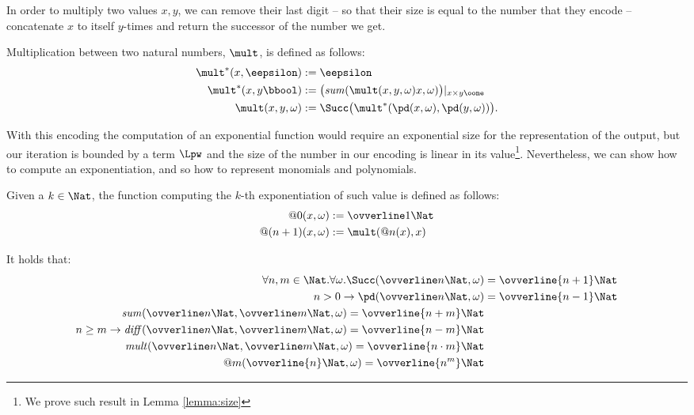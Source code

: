 \begin{conditional}{\notappendix}
  \noindent
  In order to multiply two values $x,y$,
  we can remove their last digit -- so that their size
  is equal to the number that they encode --
  concatenate $x$ to itself $y$-times and
  return the successor of the number we get.

  \begin{defn}[Multiplication]
  Multiplication between two natural numbers,
  $\mult$, is defined
  as follows:
  \begin{align*}
  {\mult^*}(x,  \eepsilon) &:= \eepsilon \\
  {\mult^*}(x, y\bbool) &:= \big(\mathit{sum}(\mult(x, y, \omega)
  x, \omega)\big)|_{x\times y\oone} \\
  \mult(x, y, \omega) &:= \Succ\big( \mult^*(\pd(x,\omega),
  \pd(y,\omega))\big).
  \end{align*}
  \end{defn}
  \noindent
  With this encoding the computation of an exponential function
  would require an exponential size for the representation
  of the output, but our iteration is bounded by a term $\Lpw$
  and the size of the number in our encoding is
  linear in its value\footnote{We prove such result in Lemma \ref{lemma:size}}.
  Nevertheless, we can show how to compute an exponentiation, and so
  how to represent monomials and polynomials.

  \begin{defn}[Exponentiation]
  Given a $k\in \Nat$, the function computing
  the $k$-th exponentiation of such value
  is defined as follows:
  \begin{align*}
    @0(x, \omega)&:= \ovverline 1 \Nat\\
    @(n+1)(x, \omega)&:= \mult(@n(x), x)\\
  \end{align*}
  \end{defn}

  \begin{remark}
    It holds that:
    \begin{align*}
      \forall n, m \in \Nat.\forall \omega. \Succ (\ovverline n \Nat, \omega) &=\ovverline {n+1} \Nat \\
      n>0\to  \pd (\ovverline n \Nat, \omega) &=\ovverline {n-1} \Nat \\
      \mathit{sum}(\ovverline n \Nat, \ovverline m \Nat, \omega)= \ovverline {n+m}\Nat\\
      n\ge m \to \mathit{diff}(\ovverline n \Nat, \ovverline m \Nat, \omega)= \ovverline {n-m}\Nat\\
      \mathit{mult}(\ovverline n \Nat, \ovverline m \Nat, \omega)= \ovverline {n\cdot m}\Nat\\
      @m(\ovverline {n}\Nat,\omega)= \ovverline {n^m}\Nat
    \end{align*}


\end{remark}
\end{conditional}
